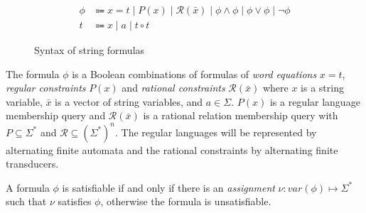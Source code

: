 \begin{figure}
\begin{align*}
\phi &\Coloneqq x = t \mid P(x) \mid \mathcal{R}(\bar{x}) \mid \phi \wedge \phi \mid \phi \vee \phi \mid \lnot \phi \\
t &\Coloneqq x \mid a \mid t \circ t
\end{align*}
\caption{Syntax of string formulas}
\label{fig:syntax-string}
\end{figure}
The formula $\phi$ is a Boolean combinations of formulas of \emph{word equations} $x = t$, \emph{regular constraints} $P(x)$ and \emph{rational constraints} $\mathcal{R}(\bar{x})$ where $x$ is a string variable, $\bar{x}$ is a vector of string variables, and $a \in \Sigma$.
$P(x)$ is a regular language membership query and $\mathcal{R}(\bar{x})$ is a rational relation membership query with $P \subseteq \Sigma^*$ and $\mathcal{R}\subseteq (\Sigma^*)^n$.
The regular languages will be represented by alternating finite automata and the rational constraints by alternating finite transducers.

A formula $\phi$ is satisfiable if and only if there is an \emph{assignment} $\nu : var(\phi) \mapsto \Sigma^*$ such that $\nu$ satisfies $\phi$, otherwise the formula is unsatisfiable.

